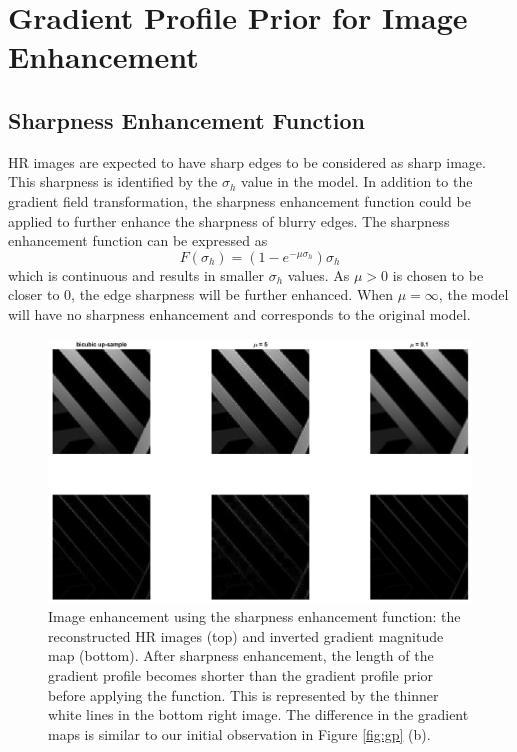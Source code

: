 \documentclass[a4paper,11pt]{article}
\begin{document}
\section{Gradient Profile Prior for Image Enhancement}
\label{sec:Gradient Profile Prior for Image Enhancement}

\subsection{Sharpness Enhancement Function}

HR images are expected to have sharp edges to be considered as sharp image. This sharpness is identified by the $\sigma_h$ value in the model. In addition to the gradient field transformation, the sharpness enhancement function could be applied to further enhance the sharpness of blurry edges. The sharpness enhancement function can be expressed as
\begin{equation}
	F(\sigma_h) = (1-e^{-\mu\sigma_h})\sigma_h
\end{equation}
which is continuous and results in smaller $\sigma_h$ values. As $\mu > 0$ is chosen to be closer to 0, the edge sharpness will be further enhanced. When $\mu = \infty$, the model will have no sharpness enhancement and corresponds to the original model.

\begin{figure}[H]
	\centering
	\includegraphics[width=1\textwidth]{mu variation.png}
	\caption{Image enhancement using the sharpness enhancement function: the reconstructed HR images (top) and inverted gradient magnitude map (bottom). After sharpness enhancement, the length of the gradient profile becomes shorter than the gradient profile prior before applying the function. This is represented by the thinner white lines in the bottom right image. The difference in the gradient maps is similar to our initial observation in Figure \ref{fig:gp} (b).}
	\label{fig:mu}
\end{figure}
\end{document}

